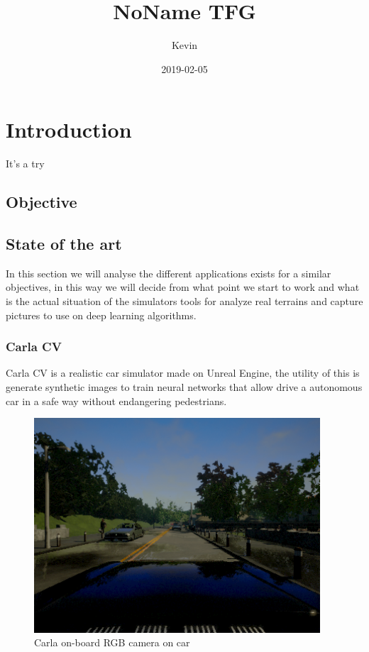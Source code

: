 \documentclass[10pt,a4paper]{article}
\author{Kevin}
\title{NoName TFG}
\date{2019-02-05}
\begin{document}
	
	\tableofcontents
	\newpage
	\listoffigures

	\newpage
	\section{Introduction}
	It's a try
	\subsection{Objective}
	
	\subsection{State of the art}
	In this section we will analyse the different applications exists for a similar objectives, in this way we will decide from what point we start to work and what is the actual situation of the simulators tools for analyze real terrains and capture pictures to use on deep learning algorithms.
	
	\subsubsection{Carla CV}
	Carla CV \cite{CarlaCV} is a realistic car simulator made on Unreal Engine, the utility of this is generate synthetic images to train neural networks that allow drive a autonomous car in a safe way without endangering pedestrians.

	\begin{figure}[h!]
		\centering
		\includegraphics[height=8cm]{carla_img}
		\caption{Carla on-board RGB camera on car}
		\label{figure:carlargb}
	\end{figure}
	
\end{document}
